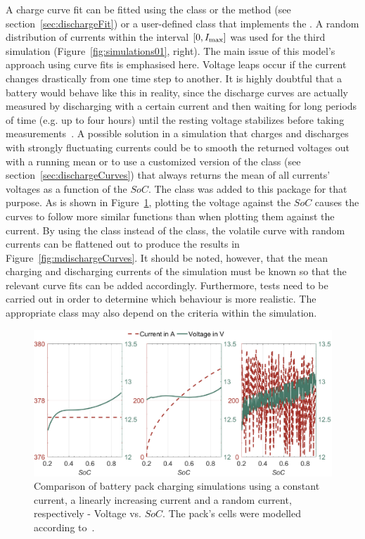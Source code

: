 A charge curve fit can be fitted using the  class or the  method (see section~\ref{sec:dischargeFit}) or a user-defined class that implements the .
A random distribution of currents within the interval $[0, I_\text{max}]$ was used for the third simulation (Figure~\ref{fig:simulations01}, right). The main issue of this model's approach using curve fits is emphasised here. Voltage leaps occur if the current changes drastically from one time step to another. It is highly doubtful that a battery would behave like this in reality, since the discharge curves are actually measured by discharging with a certain current and then waiting for long periods of time (e.g. up to four hours) until the resting voltage stabilizes before taking measurements~\cite{keil_aufbau_2012}. A possible solution in a simulation that charges and discharges with strongly fluctuating currents could be to smooth the returned voltages out with a running mean or to use a customized version of the  class (see section~\ref{sec:dischargeCurves}) that always returns the mean of all currents' voltages as a function of the $SoC$. The  class was added to this package for that purpose. As is shown in Figure~\ref{fig:simulations02}, plotting the voltage against the $SoC$ causes the curves to follow more similar functions than when plotting them against the current. By using the  class instead of the  class, the volatile curve with random currents can be flattened out to produce the results in Figure~\ref{fig:mdischargeCurves}. It should be noted, however, that the mean charging and discharging currents of the simulation must be known so that the relevant curve fits can be added accordingly. Furthermore, tests need to be carried out in order to determine which behaviour is more realistic. The appropriate class may also depend on the criteria within the simulation.
\begin{figure}[t!]
	\captionsetup{type=figure}
	\centering
	\includegraphics[width=\textwidth]{simulations02}
	\caption[Comparison of battery pack charging simulations using a constant current, a linearly increasing current and a random current, respectively - Voltage vs. $SoC$]{Comparison of battery pack charging simulations using a constant current, a linearly increasing current and a random current, respectively - Voltage vs. $SoC$. The pack's cells were modelled according to~\cite{_data_2010}.}
	\label{fig:simulations02}
\end{figure}
